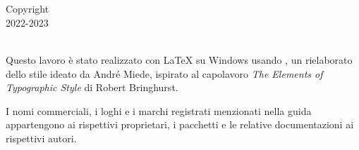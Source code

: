 
\thispagestyle{empty}

\hfill


\begin{center}
\myName \\
\smallskip
\textit{\myTitle}\\
\smallskip
Copyright \ccbyncsa\\
2022-2023
\end{center}

\medskip

\noindent\textsf{} \\
\noindent
Questo lavoro è stato realizzato con \LaTeX{} su Windows usando \arsclassica, un rielaborato dello stile \classicthesis{} ideato da Andr\'e Miede, ispirato al capolavoro \emph{The Elements of Typographic Style} di Robert Bringhurst.

\bigskip

\noindent I nomi commerciali, i loghi e i marchi registrati menzionati nella guida appartengono ai rispettivi proprietari, i pacchetti e le relative documentazioni ai rispettivi
autori.

\bigskip

\noindent
\textsf{}

\noindent
{}\,
